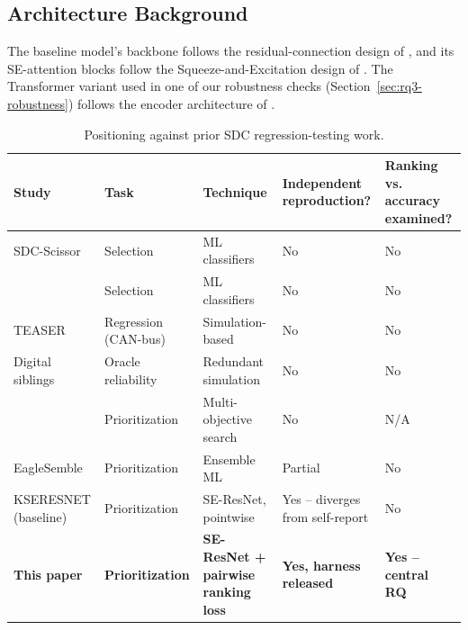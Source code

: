 \documentclass[smallextended]{svjour3}
\begin{document}
\subsection{Architecture Background}
The baseline model's backbone follows the residual-connection design of
\citet{he2016deep}, and its SE-attention blocks follow the
Squeeze-and-Excitation design of \citet{hu2018squeeze}. The Transformer
variant used in one of our robustness checks (Section~\ref{sec:rq3-robustness})
follows the encoder architecture of \citet{vaswani2017attention}.

\begin{table}[t]
\caption{Positioning against prior SDC regression-testing work.}
\label{tab:relwork}
\begin{tabular}{p{2.6cm}p{1.6cm}p{2.2cm}p{1.6cm}p{1.3cm}}
\toprule
Study & Task & Technique & Independent reproduction? & Ranking vs. accuracy examined? \\
\midrule
SDC-Scissor \citep{birchler2022cost} & Selection & ML classifiers & No & No \\
\citet{birchler2023machine,khatiri2021machine} & Selection & ML classifiers & No & No \\
TEASER \citep{birchler2023teaser} & Regression (CAN-bus) & Simulation-based & No & No \\
Digital siblings \citep{biagiola2024two} & Oracle reliability & Redundant simulation & No & No \\
\citet{birchler2023single} & Prioritization & Multi-objective search & No & N/A \\
EagleSemble \citep{aquilinoeaglesemble} & Prioritization & Ensemble ML & Partial & No \\
KSERESNET (baseline) \citep{swain2026kseresnet} & Prioritization & SE-ResNet, pointwise & Yes -- diverges from self-report & No \\
\textbf{This paper} & \textbf{Prioritization} & \textbf{SE-ResNet + pairwise ranking loss} & \textbf{Yes, harness released} & \textbf{Yes -- central RQ} \\
\bottomrule
\end{tabular}
\end{table}
\end{document}

